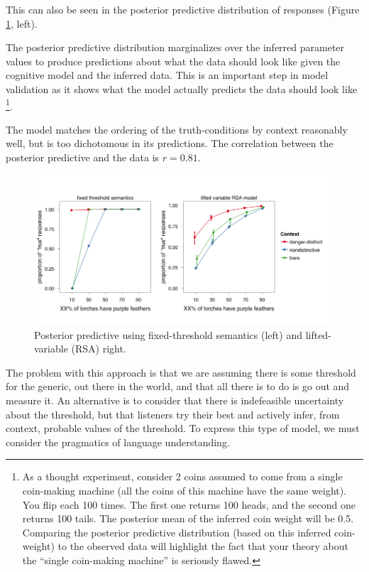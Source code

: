 \documentclass[10pt,letterpaper]{article}
\begin{document}
This can also be seen in the posterior predictive distribution of responses (Figure \ref{fig:bda1posteriorpred}, left). 

The posterior predictive distribution marginalizes over the inferred parameter values to produce predictions about what the data should look like given the cognitive model and the inferred data. This is an important step in model validation as it shows what the model actually predicts the data should look like \footnote{As a thought experiment, consider 2 coins assumed to come from a single coin-making machine (all the coins of this machine have the same weight). You flip each 100 times. The first one returns 100 heads, and the second one returns 100 tails. The posterior mean of the inferred coin weight will be 0.5. Comparing the posterior predictive distribution (based on this inferred coin-weight) to the observed data will highlight the fact that your theory about the ``single coin-making machine'' is seriously flawed.}.

The model matches the ordering of the truth-conditions by context reasonably well, but is too dichotomous in its predictions. The correlation between the posterior predictive and the data is $r = 0.81$. 

\begin{figure}
\centering
    \includegraphics[width=\columnwidth]{fig3_2pps}
    \caption{Posterior predictive using fixed-threshold semantics (left) and lifted-variable (RSA) right.}
  \label{fig:bda1posteriorpred}
\end{figure}

The problem with this approach is that we are assuming there is some threshold for the generic, out there in the world, and that all there is to do is go out and measure it. An alternative is to consider that there is indefeasible uncertainty about the threshold, but that listeners try their best and actively infer, from context, probable values of the threshold. To express this type of model, we must consider the pragmatics of language understanding. 
\end{document}

